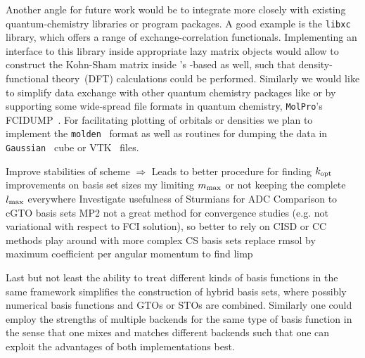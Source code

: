 Another angle for future work would be to integrate more closely
with existing quantum-chemistry libraries or program packages.
A good example is the \texttt{libxc}~\cite{Lehtola2018} library,
which offers a range of exchange-correlation functionals.
Implementing an interface to this library inside appropriate
lazy matrix objects would allow to construct the Kohn-Sham matrix
inside \molsturm's \contraction-based \SCF as well,
such that density-functional theory~(DFT) calculations
could be performed.
Similarly we would like to simplify
data exchange with other quantum chemistry packages like \pyscf or \psifour
by supporting some wide-spread file formats in quantum chemistry,
\eg \texttt{MolPro}'s FCIDUMP~\cite{Knowles1989}.
For facilitating plotting of \SCF orbitals or densities
we plan to implement the \texttt{molden}~\cite{Schaftenaar2000} format
as well as routines for dumping the data
in \texttt{Gaussian}~\cite{Frisch2016} cube or VTK~\cite{Avila2010} files.

%
%
Improve stabilities of \SCF scheme $\Rightarrow$ Leads to better procedure for finding $k_\text{opt}$
%
improvements on basis set sizes my limiting $m_\text{max}$ or not keeping the complete $l_\text{max}$ everywhere
Investigate usefulness of Sturmians for ADC
Comparison to cGTO basis sets
MP2 not a great method for convergence studies (e.g. not variational with respect to FCI solution), so better to rely on CISD or CC methods
play around with more complex CS basis sets
replace rmsol by maximum coefficient per angular momentum to find limp

%
%
Last but not least the ability to treat different kinds of basis functions
in the same framework simplifies the construction of hybrid basis sets,
where possibly numerical basis functions and GTOs or STOs are combined.
Similarly one could employ the strengths of multiple backends for the same type of basis function
in the sense that one mixes and matches different backends such that one can exploit
the advantages of both implementations best.
